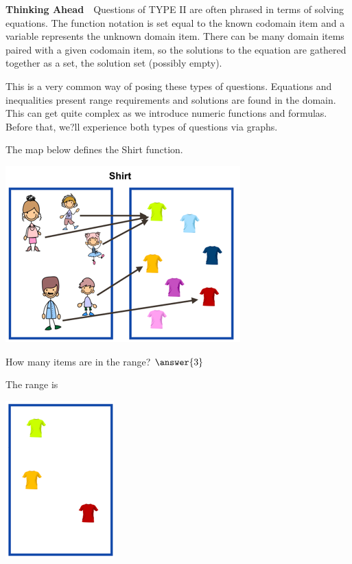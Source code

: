 \documentclass{ximera}
\begin{document}
\textbf{Thinking Ahead}\ \
Questions of TYPE II are often phrased in terms of solving equations. The function notation is set equal to the known codomain item and a variable represents the unknown domain item. There can be many domain items paired with a given codomain item, so the solutions to the equation are gathered together as a set, the solution set (possibly empty).

This is a very common way of posing these types of questions. Equations and inequalities present range requirements and solutions are found in the domain.  This can get quite complex as we introduce numeric functions and formulas.  Before that, we?ll experience both types of questions via graphs.\quad \\


\begin{question}

The map below defines the Shirt function.
\begin{image}
\includegraphics{pics/shirt_func.png}
\end{image}
How many items are in the range?  $\answer{3}$
\begin{feedback}
The range is
\begin{image}
\includegraphics{pics/shirt_range.png}
\end{image}
\end{feedback}

\end{question}
\end{document}
